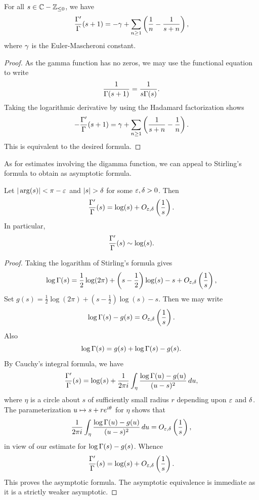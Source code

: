 \documentclass[12pt]{article}
\begin{document}
    \begin{corollary}\label{cor:logarithmic_derivative_of_gamma}
      For all \(s \in \mathbb{C}-\mathbb{Z}_{\le 0}\), we have
      \[
        \frac{\Gamma'}{\Gamma}(s+1) = -\gamma+\sum_{n \ge 1}\left(\frac{1}{n}-\frac{1}{s+n}\right),
      \]
      where \(\gamma\) is the Euler-Mascheroni constant.
    \end{corollary}
    \begin{proof}
      As the gamma function has no zeros, we may use the functional equation to write
      \[
        \frac{1}{\Gamma(s+1)} = \frac{1}{s\Gamma(s)}.
      \]
      Taking the logarithmic derivative by using the Hadamard factorization shows
      \[
        -\frac{\Gamma'}{\Gamma}(s+1) = \gamma+\sum_{n \ge 1}\left(\frac{1}{s+n}-\frac{1}{n}\right).
      \]
      This is equivalent to the desired formula.
    \end{proof}
    
    As for estimates involving the digamma function, we can appeal to Stirling's formula to obtain as asymptotic formula.

    \begin{proposition}\label{equ:approximtion_for_digamma}
      Let \(|\arg(s)| < \pi-\varepsilon\) and \(|s| > \delta\) for some \(\varepsilon,\delta > 0\). Then
      \[
        \frac{\Gamma'}{\Gamma}(s) = \log(s)+O_{\varepsilon,\delta}\left(\frac{1}{s}\right).
      \]
      In particular,
      \[
        \frac{\Gamma'}{\Gamma}(s) \sim \log(s).
      \]
    \end{proposition}
    \begin{proof}
      Taking the logarithm of Stirling's formula gives
      \[
        \log\Gamma(s) = \frac{1}{2}\log(2\pi)+\left(s-\frac{1}{2}\right)\log(s)-s+O_{\varepsilon,\delta}\left(\frac{1}{s}\right),
      \]
      Set \(g(s) = \frac{1}{2}\log(2\pi)+\left(s-\frac{1}{2}\right)\log(s)-s\). Then we may write
      \[
        \log\Gamma(s)-g(s) = O_{\varepsilon,\delta}\left(\frac{1}{s}\right).
      \]
      Also
      \[
        \log\Gamma(s) = g(s)+\log\Gamma(s)-g(s).
      \]
      By Cauchy's integral formula, we have
      \[
        \frac{\Gamma'}{\Gamma}(s) = \log(s)+\frac{1}{2\pi i}\int_{\eta}\frac{\log\Gamma(u)-g(u)}{(u-s)^{2}}\,du,
      \]
      where \(\eta\) is a circle about \(s\) of sufficiently small radius \(r\) depending upon \(\varepsilon\) and \(\delta\). The parameterization \(u \mapsto s+re^{i\theta}\) for \(\eta\) shows that
      \[
        \frac{1}{2\pi i}\int_{\eta}\frac{\log\Gamma(u)-g(u)}{(u-s)^{2}}\,du = O_{\varepsilon,\delta}\left(\frac{1}{s}\right),
      \]
      in view of our estimate for \(\log\Gamma(s)-g(s)\). Whence
      \[
        \frac{\Gamma'}{\Gamma}(s) = \log(s)+O_{\varepsilon,\delta}\left(\frac{1}{s}\right).
      \]
      This proves the asymptotic formula. The asymptotic equivalence is immediate as it is a strictly weaker asymptotic.
    \end{proof}
\end{document}
